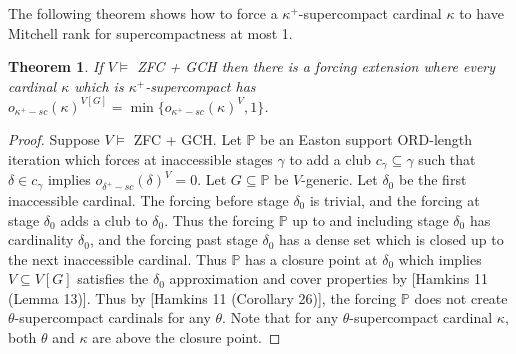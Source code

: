 \documentclass[10pt,leqno]{amsart}
\newtheorem{theorem}{Theorem}[]
\begin{document}
The following theorem shows how to force a $\kappa^+$-supercompact cardinal $\kappa$ to have Mitchell rank for supercompactness at most 1.

\begin{theorem} If $V \models$ ZFC + GCH then there is a forcing extension where every cardinal $\kappa$ which is $\kappa^+$-supercompact has $o_{\kappa^+-sc}(\kappa)^{V[G]} = \min\{o_{\kappa^+-sc}(\kappa)^V, 1\}$.
\end{theorem}

\begin{proof} Suppose $V \models $ ZFC + GCH. Let $\mathbb{P}$ be an Easton support ORD-length iteration which forces at inaccessible stages $\gamma$ to add a club $c_{\gamma} \subseteq \gamma$ such that $\delta \in c_{\gamma}$ implies $o_{\delta^+-sc}(\delta)^V = 0$. Let $G \subseteq \mathbb{P}$ be $V$-generic. Let $\delta_0$ be the first inaccessible cardinal. The forcing before stage $\delta_0$ is trivial, and the forcing at stage $\delta_0$ adds a club to $\delta_0$. Thus the forcing $\mathbb{P}$ up to and including stage $\delta_0$ has cardinality $\delta_0$, and the forcing past stage $\delta_0$ has a dense set which is closed up to the next inaccessible cardinal. Thus $\mathbb{P}$ has a closure point at $\delta_0$ which implies $V \subseteq V[G]$ satisfies the $\delta_0$ approximation and cover properties by [Hamkins 11 (Lemma 13)]. Thus by [Hamkins 11 (Corollary 26)], the forcing $\mathbb{P}$ does not create $\theta$-supercompact cardinals for any $\theta$. Note that for any $\theta$-supercompact cardinal $\kappa$, both $\theta$ and $\kappa$ are above the closure point.


\end{proof}
\end{document}
